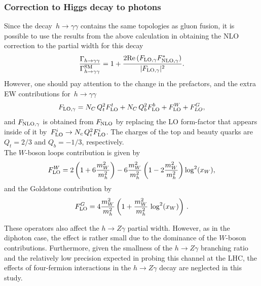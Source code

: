 		\subsubsection{Correction to Higgs decay to photons}
	Since the decay~$ h \to \gamma \gamma$ contains the same topologies as gluon fusion, it is possible to use the results from the above calculation in obtaining the NLO correction to the partial width for this decay
		\begin{equation}
			\frac{\Gamma_{h\to \gamma\gamma}}{\Gamma_{h\to \gamma\gamma}^{\mathrm{SM}}}= 1+ \frac{2 \mbox{Re}\,(F_{\textrm{LO}, \gamma} F^*_{\textrm{NLO},\gamma})}{  |F_{\textrm{LO}, \gamma}|^2} .
		\end{equation}
		However, one should pay attention to the change in the prefactors, and the extra EW contributions for~$ h \to \gamma \gamma$ 
		\begin{equation}
			F_{\textrm{LO}, \gamma}= N_C\,Q_t^2 F_{\textrm{LO}}^t+ N_C\,Q_b^2 F_{\textrm{LO}}^b+F_{\textrm{LO}}^W+ F^G_{LO} ,
		\end{equation}
		and $F_{\textrm{NLO}, \gamma}$ is obtained from $F_{\textrm{NLO}}$ by replacing the LO form-factor that appears inside of it by~$ F_{\textrm{LO}}^i \to N_c \,Q_i^2 F_{\textrm{LO}}^i$. The charges of the top and beauty quarks are $Q_t=2/3$ and $Q_b=-1/3$, respectively.\\ The $W$-boson loops contribution is given by
		\begin{equation}
			F_{\textrm{LO}}^W= 2 \left(1+6 \frac{m_W^2}{m_h^2}\right)-6 \frac{m_W^2}{  m_h^2} \left(1-2  \frac{m_W^2}{m_h^2}\right) \log^2(x_W),
		\end{equation}
		and the Goldstone contribution by
		\begin{equation}
			F_{\textrm{LO}}^G=4\frac{m_W^2}{m_h^2} \left( 1+ \frac{m_W^2}{m_h^2} \,\log^2(x_W) \right)\,.
		\end{equation}
	\par	These operators also affect the $h\to Z\gamma$ partial width. However,  as in the diphoton case, the effect is rather small due to the dominance of the $W$-boson contributions.  Furthermore, given the smallness of the $h\to Z\gamma$ branching ratio and the relatively low precision expected in probing this channel at the LHC, the effects of four-fermion interactions in the $ h \to Z\gamma$ decay are neglected in this study.
